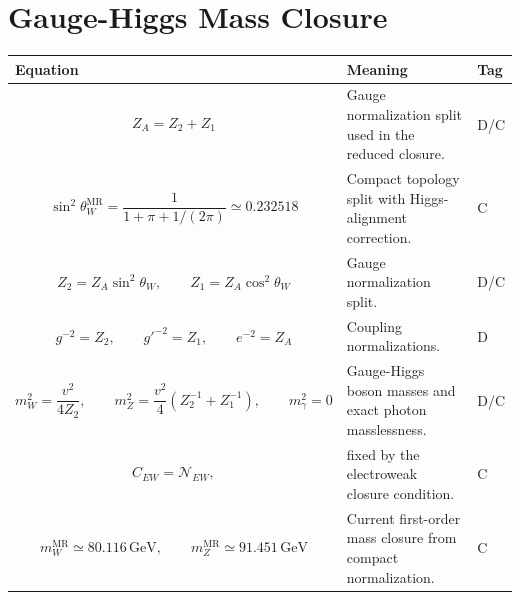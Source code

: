 \documentclass[11pt]{article}
\newcommand{\MR}{\mathrm{MR}}
\begin{document}
\section{Gauge-Higgs Mass Closure}
\begin{longtable}{>{\raggedright\arraybackslash}p{} >{\raggedright\arraybackslash}p{} >{\centering\arraybackslash}p{}}
\toprule
\textbf{Equation} & \textbf{Meaning} & \textbf{Tag} \\
\midrule
\endhead

\begin{equation}
Z_A=Z_2+Z_1
\end{equation}
& Gauge normalization split used in the reduced closure. & D/C \\

\begin{equation}
\sin^2\theta_W^{\MR}=\frac{1}{1+\pi+1/(2\pi)}\simeq0.232518
\end{equation}
& Compact topology split with Higgs-alignment correction. & C \\

\begin{equation}
Z_2=Z_A\sin^2\theta_W,
\qquad Z_1=Z_A\cos^2\theta_W
\end{equation}
& Gauge normalization split. & D/C \\

\begin{equation}
g^{-2}=Z_2,
\qquad g'^{-2}=Z_1,
\qquad e^{-2}=Z_A
\end{equation}
& Coupling normalizations. & D \\

\begin{equation}
m_W^2=\frac{v^2}{4Z_2},
\qquad
m_Z^2=\frac{v^2}{4}\left(Z_2^{-1}+Z_1^{-1}\right),
\qquad m_\gamma^2=0
\end{equation}
& Gauge-Higgs boson masses and exact photon masslessness. & D/C \\

\begin{equation}
C_{EW}=\mathcal{N}_{EW},
\end{equation}
& fixed by the electroweak closure condition. & C \\

\begin{equation}
m_W^{\MR}\simeq80.116\,\mathrm{GeV},
\qquad
m_Z^{\MR}\simeq91.451\,\mathrm{GeV}
\end{equation}
& Current first-order mass closure from compact normalization. & C \\

\bottomrule
\end{longtable}
\end{document}
